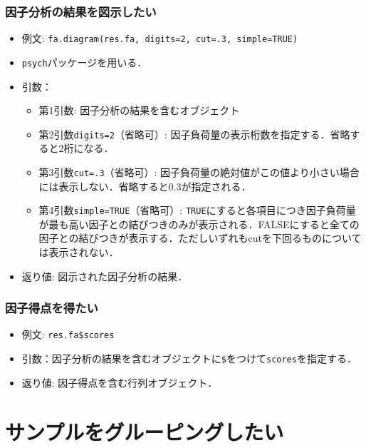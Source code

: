 \documentclass[
  xelatex, ja=standard]{bxjsarticle}
\providecommand{\tightlist}{%
  \setlength{\itemsep}{0pt}\setlength{\parskip}{0pt}}
\begin{document}
\subsubsection{因子分析の結果を図示したい}\label{ux56e0ux5b50ux5206ux6790ux306eux7d50ux679cux3092ux56f3ux793aux3057ux305fux3044}

\begin{itemize}
\tightlist
\item
  例文: \texttt{fa.diagram(res.fa,\ digits=2,\ cut=.3,\ simple=TRUE)}
\item
  \texttt{psych}パッケージを用いる．
\item
  引数：

  \begin{itemize}
  \tightlist
  \item
    第1引数: 因子分析の結果を含むオブジェクト
  \item
    第2引数\texttt{digits=2}（省略可）:
    因子負荷量の表示桁数を指定する．省略すると2桁になる．
  \item
    第3引数\texttt{cut=.3}（省略可）:
    因子負荷量の絶対値がこの値より小さい場合には表示しない．省略すると0.3が指定される．
  \item
    第4引数\texttt{simple=TRUE}（省略可）:
    \texttt{TRUE}にすると各項目につき因子負荷量が最も高い因子との結びつきのみが表示される．FALSEにすると全ての因子との結びつきが表示する．ただしいずれもcutを下回るものについては表示されない．
  \end{itemize}
\item
  返り値: 図示された因子分析の結果．
\end{itemize}

\subsubsection{因子得点を得たい}\label{ux56e0ux5b50ux5f97ux70b9ux3092ux5f97ux305fux3044}

\begin{itemize}
\tightlist
\item
  例文: \texttt{res.fa\$scores}
\item
  引数：因子分析の結果を含むオブジェクトに\texttt{\$}をつけて\texttt{scores}を指定する．
\item
  返り値: 因子得点を含む行列オブジェクト．
\end{itemize}

\section{サンプルをグルーピングしたい}\label{ux30b5ux30f3ux30d7ux30ebux3092ux30b0ux30ebux30fcux30d4ux30f3ux30b0ux3057ux305fux3044}
\end{document}
